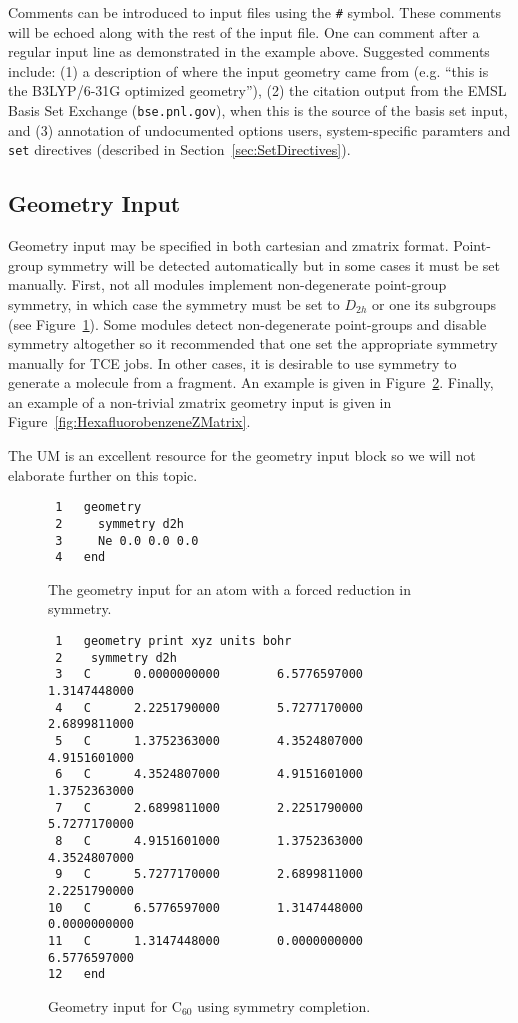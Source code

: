 \documentclass[letterpaper,12pt]{article}
\begin{document}
Comments can be introduced to input files using the \texttt{\#} symbol.  These comments will be echoed along with the rest of the input file.  One can comment after a regular input line as demonstrated in the example above.  Suggested comments include: (1) a description of where the input geometry came from (e.g. ``this is the B3LYP/6-31G optimized geometry''), (2) the citation output from the EMSL Basis Set Exchange (\texttt{bse.pnl.gov}), when this is the source of the basis set input, and (3) annotation of undocumented options users, system-specific paramters and \texttt{set} directives (described in Section~\ref{sec:SetDirectives}).

\subsection{Geometry Input}\label{sec:GeometryInput}

Geometry input may be specified in both cartesian and zmatrix format.  Point-group symmetry will be detected automatically but in some cases it must be set manually.  First, not all modules implement non-degenerate point-group symmetry, in which case the symmetry must be set to $D_{2h}$ or one its subgroups (see Figure~\ref{fig:NeonGeometry}).  Some modules detect non-degenerate point-groups and disable symmetry altogether so it recommended that one set the appropriate symmetry manually for TCE jobs.  In other cases, it is desirable to use symmetry to generate a molecule from a fragment.  An example is given in Figure~\ref{fig:C60geometry}.  Finally, an example of a non-trivial zmatrix geometry input is given in Figure~\ref{fig:HexafluorobenzeneZMatrix}.

The UM is an excellent resource for the geometry input block so we will not elaborate further on this topic.

\begin{figure}
    \caption{The geometry input for an atom with a forced reduction in symmetry.}
    \label{fig:NeonGeometry}
    \begin{verbatim}
 1   geometry
 2     symmetry d2h
 3     Ne 0.0 0.0 0.0
 4   end
    \end{verbatim}
\end{figure}

\begin{figure}
    \caption{Geometry input for C$_60$ using symmetry completion.}
    \label{fig:C60geometry}
    \begin{verbatim}
 1   geometry print xyz units bohr
 2    symmetry d2h
 3   C      0.0000000000        6.5776597000        1.3147448000
 4   C      2.2251790000        5.7277170000        2.6899811000
 5   C      1.3752363000        4.3524807000        4.9151601000
 6   C      4.3524807000        4.9151601000        1.3752363000
 7   C      2.6899811000        2.2251790000        5.7277170000
 8   C      4.9151601000        1.3752363000        4.3524807000
 9   C      5.7277170000        2.6899811000        2.2251790000
10   C      6.5776597000        1.3147448000        0.0000000000
11   C      1.3147448000        0.0000000000        6.5776597000
12   end
    \end{verbatim}
\end{figure}
\end{document}
